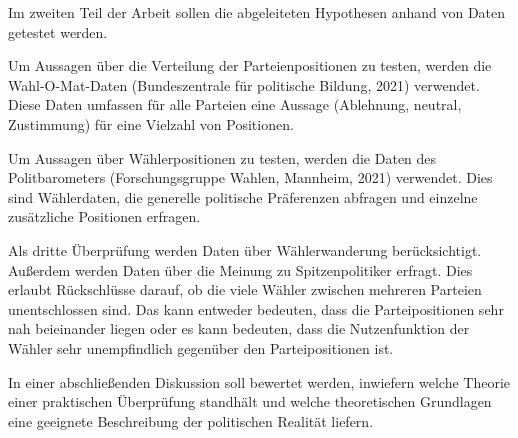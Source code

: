 Im zweiten Teil der Arbeit sollen die abgeleiteten Hypothesen anhand von Daten getestet werden. 

Um Aussagen über die Verteilung der Parteienpositionen zu testen, werden die Wahl-O-Mat-Daten (Bundeszentrale für politische Bildung, 2021) verwendet. Diese Daten umfassen für alle Parteien eine Aussage (Ablehnung, neutral, Zustimmung) für eine Vielzahl von Positionen.

Um Aussagen über Wählerpositionen zu testen, werden die Daten des Politbarometers (Forschungsgruppe Wahlen, Mannheim, 2021) verwendet. Dies sind Wählerdaten, die generelle politische Präferenzen abfragen und einzelne zusätzliche Positionen erfragen.

Als dritte Überprüfung werden Daten über Wählerwanderung berücksichtigt. Außerdem werden Daten über die Meinung zu Spitzenpolitiker erfragt. Dies erlaubt Rückschlüsse darauf, ob die viele Wähler zwischen mehreren Parteien unentschlossen sind. Das kann entweder bedeuten, dass die Parteipositionen sehr nah beieinander liegen oder es kann bedeuten, dass die Nutzenfunktion der Wähler sehr unempfindlich gegenüber den Parteipositionen ist.

In einer abschließenden Diskussion soll bewertet werden, inwiefern welche Theorie einer praktischen Überprüfung standhält und welche theoretischen Grundlagen eine geeignete Beschreibung der politischen Realität liefern.
